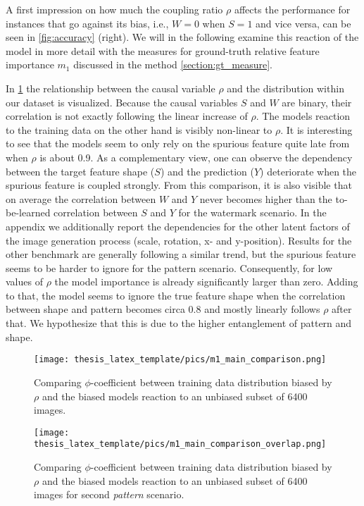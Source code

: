 A first impression on how much the coupling ratio $\rho$ affects the performance for instances that go against its bias, i.e., $W=0$ when $S=1$ and vice versa, can be seen in \cref{fig:accuracy} (right). We will in the following examine this reaction of the model in more detail with the measures for ground-truth relative feature importance $m_1$ discussed in the method \cref{section:gt_measure}. 

In \cref{fig:m0_m1} the relationship between the causal variable $\rho$ and the distribution within our dataset is visualized. Because the causal variables $S$ and $W$ are binary, their correlation is not exactly following the linear increase of $\rho$. The models reaction to the training data on the other hand is visibly non-linear to $\rho$.
It is interesting to see that the models seem to only rely on the spurious feature quite late from when $\rho$ is about 0.9. As a complementary view, one can observe the dependency between the target feature shape ($S$) and the prediction ($Y$) deteriorate when the spurious feature is coupled strongly. From this comparison, it is also visible that on average the correlation between $W$ and $Y$ never becomes higher than the to-be-learned correlation between $S$ and $Y$ for the watermark scenario. In the appendix we additionally report the dependencies for the other latent factors of the image generation process (scale, rotation, x- and y-position).
Results for the other benchmark are generally following a similar trend, but the spurious feature seems to be harder to ignore for the pattern scenario. Consequently, for low values of $\rho$ the model importance is already significantly larger than zero. Adding to that, the model seems to ignore the true feature shape when the correlation between shape and pattern becomes circa 0.8 and mostly linearly follows $\rho$ after that. We hypothesize that this is due to the higher entanglement of pattern and shape. 

\begin{figure}[t!]
    \centering
    \texttt{[image: thesis\_latex\_template/pics/m1\_main\_comparison.png]}
    \caption[$m_0$ vs. $m_1$]{Comparing $\phi$-coefficient between training data distribution biased by $\rho$ and the biased models reaction to an unbiased subset of 6400 images. }
    \label{fig:m0_m1}
\end{figure}

\begin{figure}[t!]
    \centering
    \texttt{[image: thesis\_latex\_template/pics/m1\_main\_comparison\_overlap.png]}
    \caption[$m_0$ vs. $m_1$ for Pattern Scenario]{Comparing $\phi$-coefficient between training data distribution biased by $\rho$ and the biased models reaction to an unbiased subset of 6400 images for second \textit{pattern} scenario.}
    \label{fig:m0_m1_overlap}
\end{figure}

